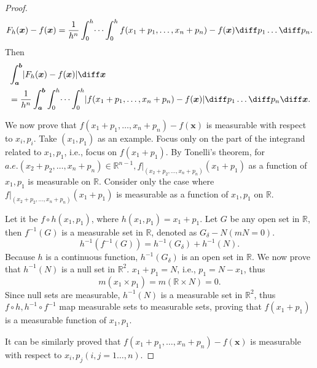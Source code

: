 \documentclass{ijclclp}
\begin{document}
\begin{proof}
    \[F_h(\boldsymbol{x})-f(\boldsymbol{x})=\frac{1}{h^n}\int_0^h\dots\int_0^h f(x_1+p_1,\dots,x_n+p_n)-f(\boldsymbol{x})\diff p_1\dots\diff p_n.\]
    Then
    \begin{align*}
        &\int_{\boldsymbol{a}}^{\boldsymbol{b}}\lvert F_h(\boldsymbol{x})-f(\boldsymbol{x})\rvert\diff \boldsymbol{x}\\
        &=\frac{1}{h^n}\int_{\boldsymbol{a}}^{\boldsymbol{b}}\int_0^h\dots\int_0^h\lvert f(x_1+p_1,\dots,x_n+p_n)-f(\boldsymbol{x})\rvert\diff p_1\dots\diff p_n\diff \boldsymbol{x}.
    \end{align*}
    
    We now prove that \(f(x_1+p_1,\dots,x_n+p_n)-f(\boldsymbol{x})\) is measurable with respect to \(x_i,p_i\). Take \((x_1,p_1)\) as an example. Focus only on the part of the integrand related to \(x_1,p_1\), i.e., focus on \(f(x_1+p_1)\).
    By Tonelli's theorem, for \(a.e.(x_2+p_2,\dots,x_n+p_n)\in\mathbb{R}^{n-1},f|_{(x_2+p_2,\dots,x_n+p_n)}(x_1+p_1)\) as a function of \(x_1,p_1\) is measurable on \(\mathbb{R}\). Consider only the case where \(f|_{(x_2+p_2,\dots,x_n+p_n)}(x_1+p_1)\) is measurable as a function of \(x_1,p_1\) on \(\mathbb{R}\).
    
    Let it be \(f\circ h(x_1,p_1)\), where \(h(x_1,p_1)=x_1+p_1\). Let \(G\) be any open set in \(\mathbb{R}\), then \(f^{-1}(G)\) is a measurable set in \(\mathbb{R}\), denoted as \(G_{\delta}-N(mN=0)\).
    \[h^{-1}(f^{-1}(G))=h^{-1}(G_{\delta})+h^{-1}(N).\]
    Because \(h\) is a continuous function, \(h^{-1}(G_{\delta})\) is an open set in \(\mathbb{R}\). 
    We now prove that \(h^{-1}(N)\) is a null set in \(\mathbb{R}^2\).
    \(x_1+p_1=N\), i.e., \(p_1=N-x_1\), thus 
    \[m(x_1\times p_1)=m(\mathbb{R}\times N)=0.\]
    Since null sets are measurable, \(h^{-1}(N)\) is a measurable set in \(\mathbb{R}^2\), thus \(f\circ h,h^{-1}\circ f^{-1}\) map measurable sets to measurable sets, proving that \(f(x_1+p_1)\) is a measurable function of \(x_1,p_1\).
    
    It can be similarly proved that \(f(x_1+p_1,\dots,x_n+p_n)-f(\boldsymbol{x})\) is measurable with respect to \(x_i,p_j(i,j=1\dots,n)\).


\end{proof}
\end{document}
